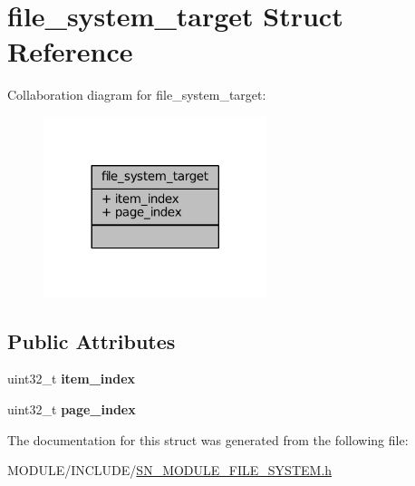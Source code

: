 \hypertarget{structfile__system__target}{}\section{file\+\_\+system\+\_\+target Struct Reference}
\label{structfile__system__target}


Collaboration diagram for file\+\_\+system\+\_\+target\+:\nopagebreak
\begin{figure}[H]
\begin{center}
\leavevmode
\includegraphics[width=185pt]{structfile__system__target__coll__graph}
\end{center}
\end{figure}
\subsection*{Public Attributes}
\begin{DoxyCompactItemize}
\item 
\mbox{\label{structfile__system__target_a6c7e2779e84950d492c24e4a0b46293d}} 
uint32\+\_\+t {\bfseries item\+\_\+index}
\item 
\mbox{\label{structfile__system__target_ace1ec0d670b0e1956bb2de800f542d88}} 
uint32\+\_\+t {\bfseries page\+\_\+index}
\end{DoxyCompactItemize}


The documentation for this struct was generated from the following file\+:\begin{DoxyCompactItemize}
\item 
M\+O\+D\+U\+L\+E/\+I\+N\+C\+L\+U\+D\+E/\hyperlink{SN__MODULE__FILE__SYSTEM_8h}{S\+N\+\_\+\+M\+O\+D\+U\+L\+E\+\_\+\+F\+I\+L\+E\+\_\+\+S\+Y\+S\+T\+E\+M.\+h}\end{DoxyCompactItemize}
